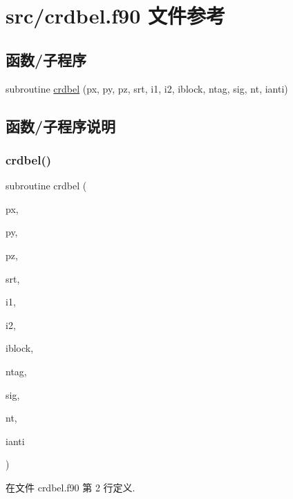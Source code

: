 \hypertarget{crdbel_8f90}{}\section{src/crdbel.f90 文件参考}
\label{crdbel_8f90}
\subsection*{函数/子程序}
\begin{DoxyCompactItemize}
\item 
subroutine \mbox{\hyperlink{crdbel_8f90_aa2c1d9087666d0c67f0077ad9d4df6f8}{crdbel}} (px, py, pz, srt, i1, i2, iblock, ntag, sig, nt, ianti)
\end{DoxyCompactItemize}


\subsection{函数/子程序说明}
\mbox{\label{crdbel_8f90_aa2c1d9087666d0c67f0077ad9d4df6f8}} 
\subsubsection{\texorpdfstring{crdbel()}{crdbel()}}
{\footnotesize\ttfamily subroutine crdbel (\begin{DoxyParamCaption}\item[{}]{px,  }\item[{}]{py,  }\item[{}]{pz,  }\item[{}]{srt,  }\item[{}]{i1,  }\item[{}]{i2,  }\item[{}]{iblock,  }\item[{}]{ntag,  }\item[{}]{sig,  }\item[{}]{nt,  }\item[{}]{ianti }\end{DoxyParamCaption})}



在文件 crdbel.\+f90 第 2 行定义.

